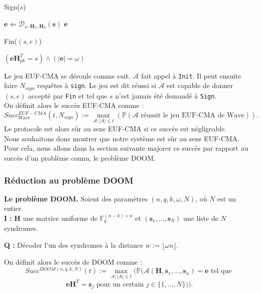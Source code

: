 \documentclass[12pt]{article}
\theoremstyle{plain}
\newcommand{\F}{\mathbb{F}}
\newcommand{\e}{\mathbf{e}}
\newcommand{\s}{\mathbf{s}}
\begin{document}
\begin{algorithm}[h]
	\caption{Sign($s$)}
	\begin{algorithmic}[1]
    	\STATE $\e \Leftarrow \mathcal{D}_{\varphi,\mathbf{H}_{U},\mathbf{H}_{V}}(\s)$
    	\RETURN $\e$
    \end{algorithmic}
\end{algorithm}

\begin{algorithm}[h]
	\caption{Fin($(s,e)$)}
	\begin{algorithmic}[1]
    	\RETURN $(\mathbf{e}\mathbf{H}_{pk}^T = s) \land (|\mathbf{e}| = \omega)$
    \end{algorithmic}
\end{algorithm}

Le jeu EUF-CMA se déroule comme suit. $\mathcal{A}$ fait appel à \verb|Init|. Il peut ensuite faire $N_{sign}$ requêtes à \verb|sign|. Le jeu est dit réussi si $\mathcal{A}$ est capable de donner $(s,e)$ accepté par \verb|Fin| et tel que $s$ n'est jamais été demandé à \verb|Sign|. \\
On définit alors le succès EUF-CMA comme :
$$Succ^{EUF-CMA}_{Wave}(t,N_{sign}) := \max_{\mathcal{A};|A|\leq t}(\mathbb{P}(\mathcal{A}\text{ réussit le jeu EUF-CMA de Wave})).$$
Le protocole est alors sûr au sens EUF-CMA si ce succès est négligeable. \\

Nous souhaitons donc montrer que notre système est sûr au sens EUF-CMA. Pour cela, nous allons dans la section suivante majorer ce succès par rapport au succès d'un problème connu, le problème DOOM.


\subsubsection{Réduction au problème DOOM}
\textbf{Le problème DOOM.} Soient des paramètres $(n,q,k,\omega,N)$, où $N$ est un entier. \\

\leftskip=1cm
\noindent \textbf{I :} $\mathbf{H}$ une matrice uniforme de $\F_q^{(n-k)\times n}$ et $(\mathbf{s}_1,...,\mathbf{s}_N)$ une liste de $N$ syndromes. 

\noindent \textbf{Q :} Décoder l'un des syndromes à la distance $w := \lfloor \omega n \rfloor$. \\

\leftskip=0cm

\noindent On définit alors le succès de DOOM comme :
$$Succ^{DOOM(n,q,k,N)}(t) := \max_{\mathcal{A};|A|\leq t}(\mathbb{P}(\mathcal{A}(\mathbf{H},\mathbf{s}_1,...,\mathbf{s}_n)=\mathbf{e}\text{ tel que }$$
$$ \mathbf{eH}^T = \mathbf{s}_j \text{ pour un certain } j \in \{1,...,N\})).$$
\end{document}
